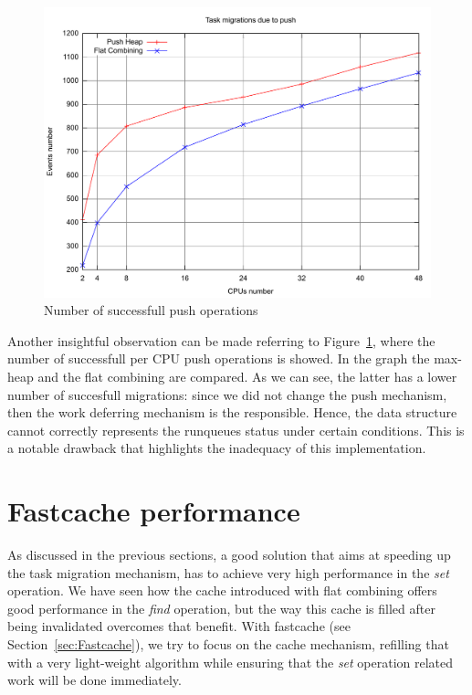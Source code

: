 \begin{figure}[htbp]
    \includegraphics[width=\columnwidth]{images/bm_fc_pushed_away}
    \caption{Number of successfull push operations}
    \label{fig:bm_fc_pushed_away}
\end{figure}

Another insightful observation can be made referring to 
Figure~\ref{fig:bm_fc_pushed_away},
where the number of successfull per CPU push operations is showed. In the
graph the max-heap and the flat combining are compared. As we can see,
the latter has a lower number of succesfull migrations: since we
did not change the push mechanism, then the work
deferring mechanism is the responsible. Hence, the data structure 
cannot correctly represents the runqueues status under certain conditions.
This is a notable drawback that highlights the inadequacy of this
implementation.

\section{Fastcache performance\label{sec:fastcache_perf}}

As discussed in the previous sections, a good solution that aims at
speeding up the task migration mechanism, has to achieve very high performance
in the \emph{set} operation. We have seen how the cache introduced
with flat combining offers good performance in the \emph{find} operation,
but the way this cache is filled after being invalidated overcomes that
benefit. With fastcache	(see Section~\ref{sec:Fastcache}), we try to focus on the cache mechanism,
refilling that with a very light-weight algorithm while ensuring that
the \emph{set} operation related work will be done immediately.

